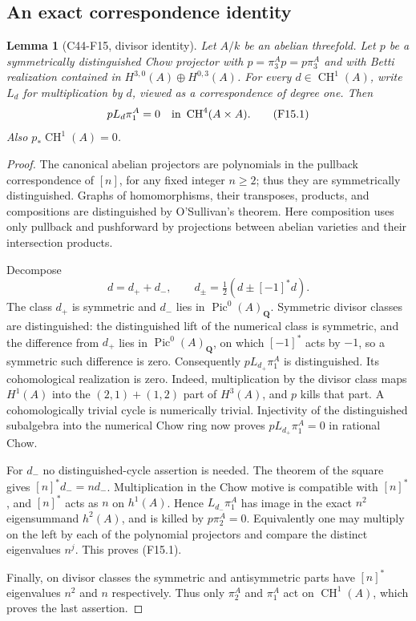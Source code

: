 \documentclass[11pt]{article}
\newtheorem{lemma}[theorem]{Lemma}
\theoremstyle{remark}\newtheorem{remark}[theorem]{Remark}
\begin{document}
\subsection{An exact correspondence identity}

\begin{lemma}[C44-F15, divisor identity]\label{C44-F15-identity}
Let $A/k$ be an abelian threefold.  Let $p$ be a symmetrically
distinguished Chow projector with $p=\pi_3^A p=p\pi_3^A$ and with
Betti realization contained in
$H^{3,0}(A)\oplus H^{0,3}(A)$.  For every
$d\in\operatorname{CH}^1(A)$, write $L_d$ for multiplication by $d$,
viewed as a correspondence of degree one.  Then
\[
                 p L_d\pi_1^A=0
       \quad\hbox{in }\operatorname{CH}^4(A\times A).
       \tag{F15.1}
\]
Also $p_*\operatorname{CH}^1(A)=0$.
\end{lemma}

\begin{proof}
The canonical abelian projectors are polynomials in the pullback
correspondence of $[n]$, for any fixed integer $n\ge2$; thus they
are symmetrically distinguished.  Graphs of homomorphisms, their
transposes, products, and compositions are distinguished by
O'Sullivan's theorem.  Here composition uses only pullback and
pushforward by projections between abelian varieties and their
intersection products.

Decompose
\[
 d=d_++d_-,\qquad d_\pm=\tfrac12(d\pm[-1]^*d).
 \tag{F15.2}
\]
The class $d_+$ is symmetric and $d_-$ lies in
$\operatorname{Pic}^0(A)_{\mathbf Q}$.  Symmetric divisor classes
are distinguished: the distinguished lift of the numerical class
is symmetric, and the difference from $d_+$ lies in
$\operatorname{Pic}^0(A)_{\mathbf Q}$, on which $[-1]^*$ acts by
$-1$, so a symmetric such difference is zero.
Consequently $p L_{d_+}\pi_1^A$ is distinguished.  Its cohomological
realization is zero.  Indeed, multiplication by the divisor class
maps $H^1(A)$ into the $(2,1)+(1,2)$ part of $H^3(A)$, and $p$
kills that part.  A cohomologically trivial cycle is numerically
trivial.  Injectivity of the distinguished subalgebra into the
numerical Chow ring now proves
$p L_{d_+}\pi_1^A=0$ in rational Chow.

For $d_-$ no distinguished-cycle assertion is needed.
The theorem of the square gives $[n]^*d_-=n d_-$.
Multiplication in the Chow motive is compatible with $[n]^*$,
and $[n]^*$ acts as $n$ on $h^1(A)$.  Hence
$L_{d_-}\pi_1^A$ has image in the exact $n^2$ eigensummand
$h^2(A)$, and is killed by $p\pi_2^A=0$.
Equivalently one may multiply on the left by each of the
polynomial projectors and compare the distinct eigenvalues
$n^j$.  This proves (F15.1).

Finally, on divisor classes the symmetric and antisymmetric
parts have $[n]^*$ eigenvalues $n^2$ and $n$ respectively.  Thus
only $\pi_2^A$ and $\pi_1^A$ act on $\operatorname{CH}^1(A)$,
which proves the last assertion.
\end{proof}
\end{document}
